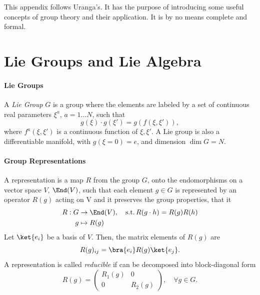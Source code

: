 This appendix follows Uranga's. It has the purpose of introducing some useful concepts of group theory and their application. It is by no means complete and formal.

\section{Lie Groups and Lie Algebra}
\paragraph{Lie Groups}
A \emph{Lie Group} $G$ is a group where the elements are labeled by a set of continuous real parameters $\xi^a$, $a = 1 \dots N$, such that
\begin{equation}
    g(\xi) \cdot g(\xi') = g(f(\xi,\xi')),
\end{equation}
where $f^a(\xi,\xi')$ is a continuous function of $\xi,\xi'$. A Lie group is also a differentiable manifold, with $g(\xi=0)=e$, and dimension $\dim{G} = N$.

\paragraph{Group Representations}
A representation is a map $R$ from the group $G$, onto the endomorphisms on a vector space $V$, $\End(V)$, such that each element $g \in G$ is represented by an operator $R(g)$ acting on V and it preserves the group properties, that it
\begin{equation}
\begin{aligned}
    R: G &\to \End(V),  \quad \textup{s.t.} \, R(g \cdot h) = R(g)R(h)\\
       g &\mapsto R(g)
\end{aligned}
\end{equation}
Let $\ket{e_i}$ be a basis of $V$. Then, the matrix elements of $R(g)$ are
\begin{equation}
    R(g)_{ij} = \bra{e_i} R(g) \ket{e_j}.
\end{equation}
A representation is called \emph{reducible} if can be decomposed into block-diagonal form
\begin{equation}
     R(g) = \begin{pmatrix}
        R_1(g) & 0 \\
        0 & R_2(g)
    \end{pmatrix}, \quad \forall g \in G .
\end{equation}


